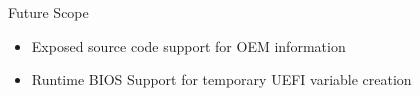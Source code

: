 \begin{frame}{Future Scope}
	\begin{itemize}
		\item Exposed source code support for OEM information
		\item Runtime BIOS Support for temporary UEFI variable creation	
	\end{itemize}
\end{frame}